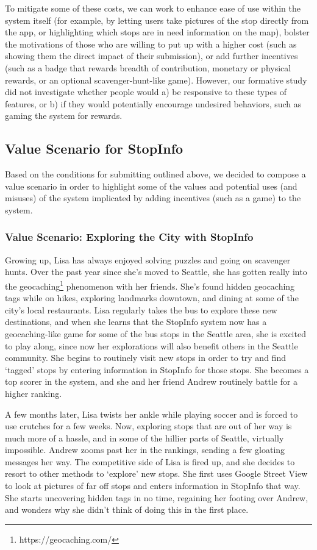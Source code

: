 To mitigate some of these costs, we can work to enhance ease of use within the system itself (for example, by letting users take pictures of the stop directly from the app, or highlighting which stops are in need information on the map), bolster the motivations of those who are willing to put up with a higher cost (such as showing them the direct impact of their submission), or add further incentives (such as a badge that rewards breadth of contribution, monetary or physical rewards, or an optional scavenger-hunt-like game). However, our formative study did not investigate whether people would a) be responsive to these types of features, or b) if they would potentially encourage undesired behaviors, such as gaming the system for rewards. 

\subsection{Value Scenario for StopInfo}
Based on the conditions for submitting outlined above, we decided to compose a value scenario in order to highlight some of the values and potential uses (and misuses) of the system implicated by adding incentives (such as a game) to the system. 

\subsubsection{Value Scenario: Exploring the City with StopInfo}
Growing up, Lisa has always enjoyed solving puzzles and going on scavenger hunts. Over the past year since she's moved to Seattle, she has gotten really into the geocaching\footnote{https://geocaching.com/} phenomenon with her friends. She's found hidden geocaching tags while on hikes, exploring landmarks downtown, and dining at some of the city's local restaurants. Lisa regularly takes the bus to explore these new destinations, and when she learns that the StopInfo system now has a geocaching-like game for some of the bus stops in the Seattle area, she is excited to play along, since now her explorations will also benefit others in the Seattle community. She begins to routinely visit new stops in order to try and find `tagged' stops by entering information in StopInfo for those stops. She becomes a top scorer in the system, and she and her friend Andrew routinely battle for a higher ranking.

A few months later, Lisa twists her ankle while playing soccer and is forced to use crutches for a few weeks. Now, exploring stops that are out of her way is much more of a hassle, and in some of the hillier parts of Seattle, virtually impossible. Andrew zooms past her in the rankings, sending a few gloating messages her way. The competitive side of Lisa is fired up, and she decides to resort to other methods to `explore' new stops. She first uses Google Street View to look at pictures of far off stops and enters information in StopInfo that way. She starts uncovering hidden tags in no time, regaining her footing over Andrew, and wonders why she didn't think of doing this in the first place.

